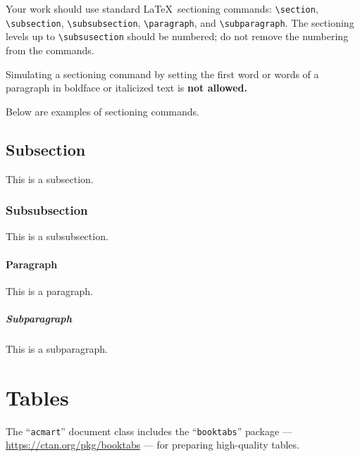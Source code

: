 \documentclass[sigconf]{acmart}
\begin{document}
Your work should use standard \LaTeX\ sectioning commands:
\verb|\section|, \verb|\subsection|, \verb|\subsubsection|,
\verb|\paragraph|, and \verb|\subparagraph|. The sectioning levels up to
\verb|\subsusection| should be numbered; do not remove the numbering
from the commands.

Simulating a sectioning command by setting the first word or words of
a paragraph in boldface or italicized text is {\bfseries not allowed.}

Below are examples of sectioning commands.

\subsection{Subsection}
\label{sec:subsection}

This is a subsection.

\subsubsection{Subsubsection}
\label{sec:subsubsection}

This is a subsubsection.

\paragraph{Paragraph}

This is a paragraph.

\subparagraph{Subparagraph}

This is a subparagraph.

\section{Tables}

The ``\verb|acmart|'' document class includes the ``\verb|booktabs|''
package --- \url{https://ctan.org/pkg/booktabs} --- for preparing
high-quality tables.
\end{document}
